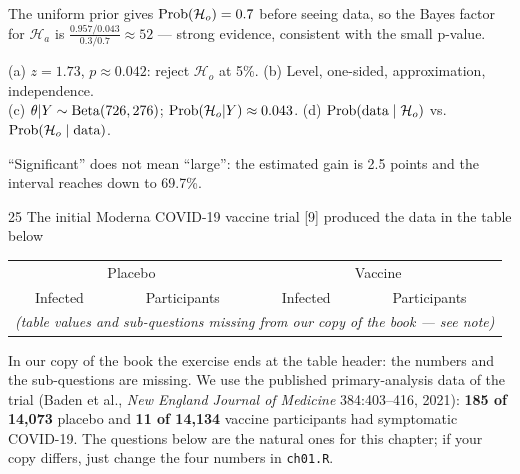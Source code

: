 \documentclass[11pt]{article}
\begin{document}
\begin{sanity}
The uniform prior gives $\mathrm{Prob}(\mathcal H_o)=0.7$ before seeing data, so the Bayes factor for $\mathcal H_a$ is $\frac{0.957/0.043}{0.3/0.7}\approx52$ --- strong evidence, consistent with the small p-value.
\end{sanity}

\begin{answer}
(a) $z=1.73$, $p\approx0.042$: reject $\mathcal H_o$ at 5\%. \quad (b) Level, one-sided, approximation, independence.\\
(c) $\theta|Y\sim\mathrm{Beta}(726,276)$; $\mathrm{Prob}(\mathcal H_o|Y)\approx0.043$. \quad (d) $\mathrm{Prob}(\text{data}\mid\mathcal H_o)$ vs.\ $\mathrm{Prob}(\mathcal H_o\mid\text{data})$.
\end{answer}

\begin{takeaway}
``Significant'' does not mean ``large'': the estimated gain is 2.5 points and the interval reaches down to 69.7\%.
\end{takeaway}


\begin{problem}{25}
The initial Moderna COVID-19 vaccine trial [9] produced the data in the table below
\begin{center}
\begin{tabular}{cc|cc}\toprule
\multicolumn{2}{c|}{Placebo} & \multicolumn{2}{c}{Vaccine}\\
Infected & Participants & Infected & Participants\\\midrule
\multicolumn{4}{c}{\emph{(table values and sub-questions missing from our copy of the book --- see note)}}\\\bottomrule
\end{tabular}
\end{center}
\end{problem}

\begin{note}
In our copy of the book the exercise ends at the table header: the numbers and the sub-questions are missing. We use the published primary-analysis data of the trial (Baden et al., \emph{New England Journal of Medicine} 384:403--416, 2021): \textbf{185 of 14{,}073} placebo and \textbf{11 of 14{,}134} vaccine participants had symptomatic COVID-19. The questions below are the natural ones for this chapter; if your copy differs, just change the four numbers in \texttt{ch01.R}.
\end{note}
\end{document}
